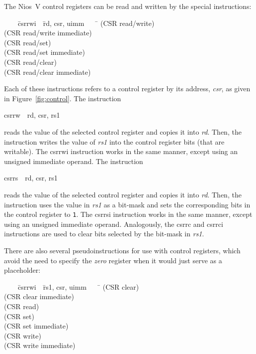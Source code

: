 \documentclass[11pt, twoside, pdftex]{article}
\newenvironment{ctabbing}%
{\begin{center}\begin{minipage}{\textwidth}\begin{tabbing}}
{\end{tabbing}\end{minipage}\end{center}}
\begin{document}
The Nios~V control registers can be read and written by the special instructions:
\begin{ctabbing}
~~~~\={\sf csrrwi}~~\={\sf rd, csr, uimm}~~~~\=\kill
{}  \>(CSR read/write)\\
  \>(CSR read/write immediate)\\
  \>(CSR read/set)\\
  \>(CSR read/set immediate)\\
  \>(CSR read/clear)\\
  \>(CSR read/clear immediate)\\
\end{ctabbing}
\vspace{-\baselineskip}
\noindent
Each of these instructions refers to a control register by its address, {\it csr}, as
given in Figure~\ref{fig:control}.  The instruction
\vspace{-\baselineskip}
\begin{center}
{\sf csrrw~~rd, csr, rs1} 
\end{center}
reads the value of the selected control register and copies it into {\it rd}. Then, the 
instruction writes the value of {\it rs1} into the control register bits (that are
writable). The {\sf csrrwi} instruction works in the same manner, except using an unsigned
immediate operand.
\newpage 
The instruction
\vspace{-\baselineskip}
\begin{center}
{\sf csrrs~~rd, csr, rs1} 
\end{center}
reads the value of the selected control register and copies it into {\it rd}. Then, the 
instruction uses the value in {\it rs1} as a bit-mask and sets the corresponding bits in the 
control register to \texttt{1}.  The {\sf csrrsi} instruction works in the same manner, 
except using an unsigned immediate operand.
Analogously, the {\sf csrrc} and {\sf csrrci} 
instructions are used to clear bits selected by the bit-mask in {\it rs1}. 

There are also several pseudoinstructions for use with control registers, which avoid the
need to specify the {\it zero} register when it would just serve as a placeholder:
\begin{ctabbing}
~~~~\={\sf csrrwi}~~\={\sf rs1, csr, uimm}~~~~\=\kill
{}  \>(CSR clear)\\
  \>(CSR clear immediate)\\
  \>(CSR read)\\
  \>(CSR set)\\
  \>(CSR set immediate)\\
  \>(CSR write)\\
  \>(CSR write immediate)\\
\end{ctabbing}
\vspace{-\baselineskip}
\end{document}
